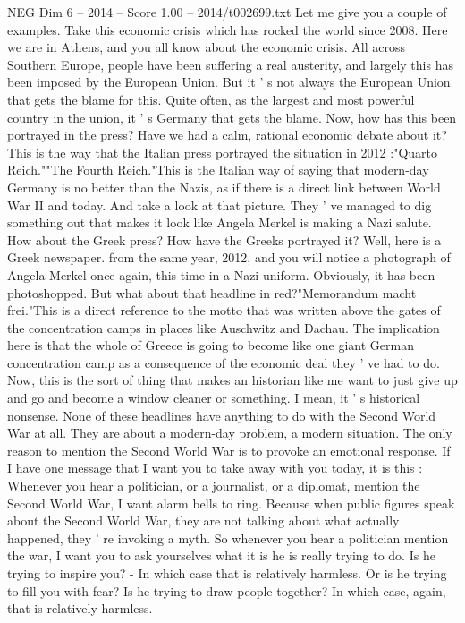 \begin{textsample}{NEG Dim 6 – 2014 – Score 1.00 – 2014/t002699.txt}
Let me give you a couple of examples.
Take this economic crisis which has rocked the world since 2008.
Here we are in Athens, and you all know about the economic crisis.
All across Southern Europe, people have been suffering a real austerity, and largely this has been imposed by the European Union.
But it ' s not always the European Union that gets the blame for this.
Quite often, as the largest and most powerful country in the union, it ' s Germany that gets the blame.
Now, how has this been portrayed in the press?
Have we had a calm, rational economic debate about it?
This is the way that the Italian press portrayed the situation in 2012 :"Quarto Reich.""The Fourth Reich."This is the Italian way of saying that modern-day Germany is no better than the Nazis, as if there is a direct link between World War II and today.
And take a look at that picture.
They ' ve managed to dig something out that makes it look like Angela Merkel is making a Nazi salute.
How about the Greek press?
How have the Greeks portrayed it?
Well, here is a Greek newspaper. from the same year, 2012, and you will notice a photograph of Angela Merkel once again, this time in a Nazi uniform.
Obviously, it has been photoshopped.
But what about that headline in red?"Memorandum macht frei."This is a direct reference to the motto that was written above the gates of the concentration camps in places like Auschwitz and Dachau.
The implication here is that the whole of Greece is going to become like one giant German concentration camp as a consequence of the economic deal they ' ve had to do.
Now, this is the sort of thing that makes an historian like me want to just give up and go and become a window cleaner or something.
I mean, it ' s historical nonsense.
None of these headlines have anything to do with the Second World War at all.
They are about a modern-day problem, a modern situation.
The only reason to mention the Second World War is to provoke an emotional response.
If I have one message that I want you to take away with you today, it is this : Whenever you hear a politician, or a journalist, or a diplomat, mention the Second World War, I want alarm bells to ring.
Because when public figures speak about the Second World War, they are not talking about what actually happened, they ' re invoking a myth.
So whenever you hear a politician mention the war, I want you to ask yourselves what it is he is really trying to do.
Is he trying to inspire you? - In which case that is relatively harmless.
Or is he trying to fill you with fear?
Is he trying to draw people together?
In which case, again, that is relatively harmless.

\end{textsample}
